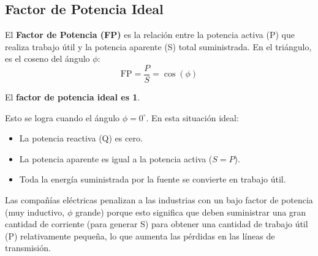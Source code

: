 \documentclass[12pt, letterpaper]{article}
\begin{document}
\subsection*{Factor de Potencia Ideal}

El \textbf{Factor de Potencia (FP)} es la relación entre la potencia activa (P) que realiza trabajo útil y la potencia aparente (S) total suministrada. En el triángulo, es el coseno del ángulo $\phi$:
\[ \text{FP} = \frac{P}{S} = \cos(\phi) \]

El \textbf{factor de potencia ideal es 1}.

Esto se logra cuando el ángulo $\phi = 0^\circ$. En esta situación ideal:
\begin{itemize}
	\item La potencia reactiva (Q) es cero.
	\item La potencia aparente es igual a la potencia activa ($S = P$).
	\item Toda la energía suministrada por la fuente se convierte en trabajo útil.
\end{itemize}

Las compañías eléctricas penalizan a las industrias con un bajo factor de potencia (muy inductivo, $\phi$ grande) porque esto significa que deben suministrar una gran cantidad de corriente (para generar S) para obtener una cantidad de trabajo útil (P) relativamente pequeña, lo que aumenta las pérdidas en las líneas de transmisión.


\end{document}

